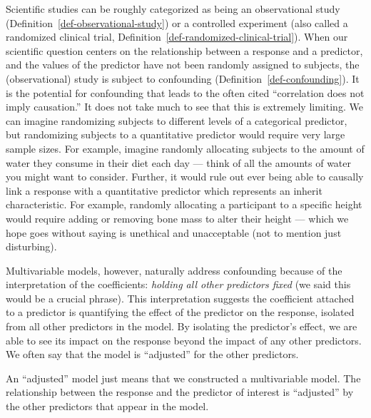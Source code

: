 \documentclass[
  letterpaper,
  DIV=11,
  numbers=noendperiod]{scrreprt}
\theoremstyle{definition}
\theoremstyle{definition}
\theoremstyle{remark}
\begin{document}
Scientific studies can be roughly categorized as being an observational
study (Definition~\ref{def-observational-study}) or a controlled
experiment (also called a randomized clinical trial,
Definition~\ref{def-randomized-clinical-trial}). When our scientific
question centers on the relationship between a response and a predictor,
and the values of the predictor have not been randomly assigned to
subjects, the (observational) study is subject to confounding
(Definition~\ref{def-confounding}). It is the potential for confounding
that leads to the often cited ``correlation does not imply causation.''
It does not take much to see that this is extremely limiting. We can
imagine randomizing subjects to different levels of a categorical
predictor, but randomizing subjects to a quantitative predictor would
require very large sample sizes. For example, imagine randomly
allocating subjects to the amount of water they consume in their diet
each day --- think of all the amounts of water you might want to
consider. Further, it would rule out ever being able to causally link a
response with a quantitative predictor which represents an inherit
characteristic. For example, randomly allocating a participant to a
specific height would require adding or removing bone mass to alter
their height --- which we hope goes without saying is unethical and
unacceptable (not to mention just disturbing).

Multivariable models, however, naturally address confounding because of
the interpretation of the coefficients: \emph{holding all other
predictors fixed} (we said this would be a crucial phrase). This
interpretation suggests the coefficient attached to a predictor is
quantifying the effect of the predictor on the response, isolated from
all other predictors in the model. By isolating the predictor's effect,
we are able to see its impact on the response beyond the impact of any
other predictors. We often say that the model is ``adjusted'' for the
other predictors.

\begin{tcolorbox}[enhanced jigsaw, left=2mm, toprule=.15mm, arc=.35mm, breakable, opacitybacktitle=0.6, opacityback=0, rightrule=.15mm, colbacktitle=quarto-callout-note-color!10!white, coltitle=black, leftrule=.75mm, toptitle=1mm, colframe=quarto-callout-note-color-frame, titlerule=0mm, title=\textcolor{quarto-callout-note-color}{\faInfo}\hspace{0.5em}{Adjusted Models}, bottomrule=.15mm, colback=white, bottomtitle=1mm]

An ``adjusted'' model just means that we constructed a multivariable
model. The relationship between the response and the predictor of
interest is ``adjusted'' by the other predictors that appear in the
model.

\end{tcolorbox}
\end{document}

